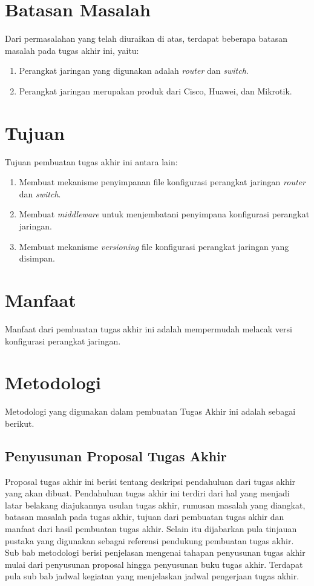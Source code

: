 	\section{Batasan Masalah}
		Dari permasalahan yang telah diuraikan di atas, terdapat beberapa batasan masalah pada tugas akhir ini, yaitu:
		\begin{enumerate}
			\item Perangkat jaringan yang digunakan adalah \textit{router} dan \textit{switch}.
            \item Perangkat jaringan merupakan produk dari Cisco, Huawei, dan Mikrotik.
           
		\end{enumerate}

	\section{Tujuan}
       	Tujuan pembuatan tugas akhir ini antara lain:
        \begin{enumerate}
        	\item Membuat mekanisme penyimpanan file konfigurasi perangkat jaringan \textit{router} dan \textit{switch}.
        	\item Membuat \textit{middleware} untuk menjembatani penyimpana konfigurasi perangkat jaringan.
        	\item Membuat mekanisme \textit{versioning} file konfigurasi perangkat jaringan yang disimpan.
        \end{enumerate}
        
	\section{Manfaat}
    	Manfaat dari pembuatan tugas akhir ini adalah mempermudah melacak versi konfigurasi perangkat jaringan.\\
    	
   	\section{Metodologi}
   		Metodologi yang digunakan dalam pembuatan Tugas Akhir ini adalah sebagai berikut.
   		
   		\subsection{Penyusunan Proposal Tugas Akhir}
   			Proposal tugas akhir ini berisi tentang deskripsi pendahuluan dari tugas akhir yang akan dibuat. Pendahuluan tugas akhir ini terdiri dari hal yang menjadi latar belakang diajukannya usulan tugas akhir, rumusan masalah yang diangkat, batasan masalah pada tugas akhir, tujuan dari pembuatan tugas akhir dan manfaat dari hasil pembuatan tugas akhir. Selain itu dijabarkan pula tinjauan pustaka yang digunakan sebagai referensi pendukung pembuatan tugas akhir. Sub bab metodologi berisi penjelasan mengenai tahapan penyusunan tugas akhir mulai dari penyusunan proposal hingga penyusunan buku tugas akhir. Terdapat pula sub bab jadwal kegiatan yang menjelaskan jadwal pengerjaan tugas akhir.
   			
